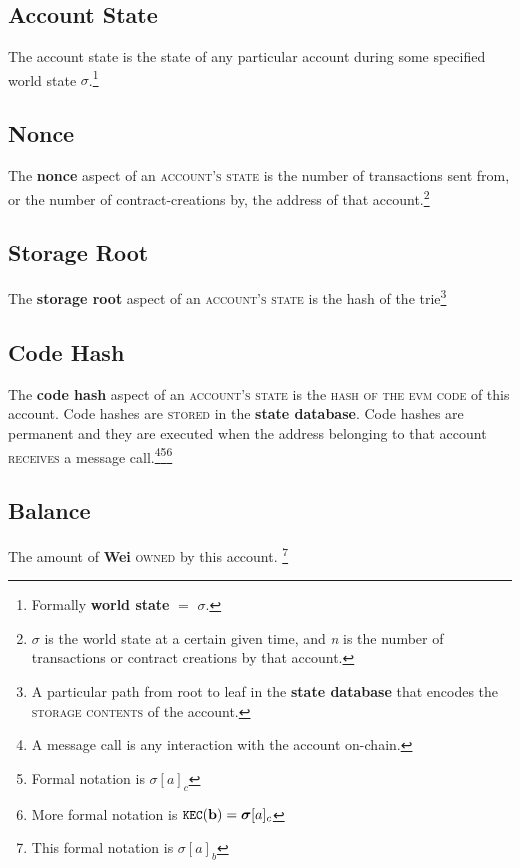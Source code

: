 \documentclass[11pt,a4paper,leqno,bibliography=totoc]{scrartcl}
\newenvironment{alphafootnotes}
    {\par\edef\savedfootnotenumber{\number\value{footnote}}
    \renewcommand{\thefootnote}{\alph{footnote}}
     \setcounter{footnote}{0}}
    {\par\setcounter{footnote}{\savedfootnotenumber}}
\begin{document}
\begin{alphafootnotes}
\begin{multicols}{2}
    \section{Account State}

    The account state is the state of any particular account during some specified world state $\sigma$.\footnote{Formally \textbf{world state} $=$ $\sigma$.} \par

    		\subsection{Nonce} The \textbf{nonce} aspect of an \textsc{account's state} is the number of transactions sent from, or the number of contract-creations by, the address of that account.\footnote{$\sigma$ is the world state at a certain given time, and \textit{n} is the number of transactions or contract creations by that account.}
    		\subsection{Storage Root}
    		The \textbf{storage root} aspect of an \textsc{account's state} is the hash of the trie\footnote{A particular path from root to leaf in the \textbf{\gls{state database}} that encodes the \textsc{storage contents} of the account.}
    		\subsection{Code Hash}
    		The \textbf{code hash} aspect of an \textsc{account's state} is the \textsc{hash of the evm code} of this account. Code hashes are \textsc{stored} in the \textbf{\gls{state database}}. Code hashes are permanent and they are executed when the address belonging to that account \textsc{receives} a message call.\footnote{A message call is any interaction with the account on-chain.}\footnote{Formal notation is $\sigma[a]_c$}\footnote{More formal notation is $\texttt{\small KEC}(\mathbf{b}) = \boldsymbol{\sigma}[a]_c$}
    		\subsection{Balance}
    		The amount of \textbf{Wei} \textsc{owned} by this account. \footnote{This formal notation is $\sigma[a]_b$}





    \begin{itemize}


\end{itemize}
\end{multicols}
\end{alphafootnotes}
\end{document}
